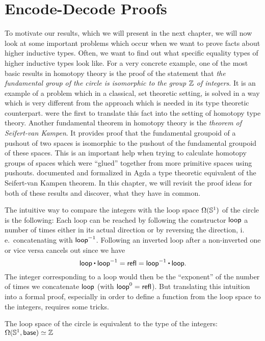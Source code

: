 \section{Encode-Decode Proofs}\label{sec:hit-encode-decode}

To motivate our results, which we will present in the next chapter,
we will now look at some important problems which occur when
we want to prove facts about higher inductive types.
Often, we want to find out what specific equality types of
higher inductive types look like.
For a very concrete example, one of the most basic results in homotopy theory
is the proof of the statement that \emph{the fundamental group of the circle is
isomorphic to the group $\mathbb Z$ of integers}.
It is an example of a problem which in a classical, set theoretic setting,
is solved in a way which is very different from the approach which is needed
in its type theoretic counterpart.
\cite{licataShulman_circle} were the first to translate this fact into the
setting of homotopy type theory.
Another fundamental theorem in homotopy theory is the \emph{theorem of
Seifert-van Kampen}.
It provides proof that the fundamental groupoid of a pushout of two spaces is
isomorphic to the pushout of the fundamental groupoid of these spaces.
This is an important help when trying to calculate homotopy groups of spaces
which were ``glued'' together from more primitive spaces using pushouts.
\cite{favonia:SvK} documented and formalized in Agda a type theoretic
equivalent of the Seifert-van Kampen theorem.
In this chapter, we will revisit the proof ideas for both of these results
and discover, what they have in common.

The intuitive way to compare the integers with the loop space
$\Omega(\mathbb{S}^1)$ of the circle is the following:
Each loop can be reached by following the constructor $\mathsf{loop}$ a number of
times either in its actual direction or by reversing the direction, i.\,e.\
concatenating with $\mathsf{loop} ^{-1}$.
Following an inverted loop after a non-inverted one or vice versa cancels out since
we have
\begin{equation*}
\Sloop \ct \Sloop \inv = \refl = \Sloop \inv \ct \Sloop \text{.}
\end{equation*}
The integer corresponding to a loop would then be the ``exponent'' of the number
of times we concatenate $\mathsf{loop}$ (with $\mathsf{loop}^0 = \mathsf{refl}$).
But translating this intuition into a formal proof, especially in order
to define a function from the loop space to the integers, requires some tricks.
\begin{thm}[Loop Space of the Circle, \cite{licataShulman_circle}]\label{thm:hit-s1}
The loop space of the circle is equivalent to the
type of the integers: $\Omega(\mathbb{S}^1, \mathsf{base}) \simeq \mathbb Z$
\end{thm}

